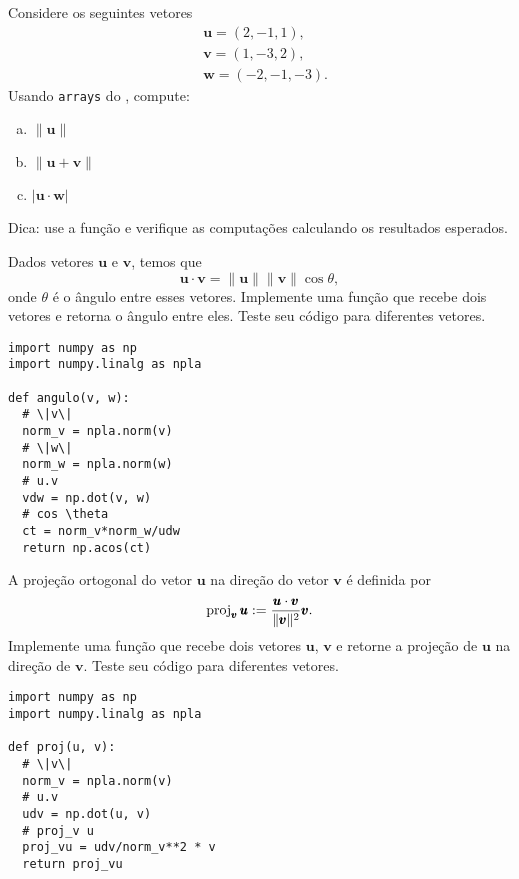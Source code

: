 \begin{exer}
  Considere os seguintes vetores
  \begin{align}
    & \pmb{u} = (2, -1, 1), \\
    & \pmb{v} = (1, -3, 2), \\
    & \pmb{w} = (-2, -1, -3).
  \end{align}
  Usando \texttt{arrays} do {\numpy}, compute:
  \begin{enumerate}[a)]
  \item $\|\pmb{u}\|$
  \item $\|\pmb{u} + \pmb{v}\|$
  \item $|\pmb{u}\cdot \pmb{w}|$
  \end{enumerate}
\end{exer}
\begin{resp}
  Dica: use a função {\PYTHONnumpyDOTlinalgDOTnorm} e verifique as computações calculando os resultados esperados.
\end{resp}

\begin{exer}
  Dados vetores $\pmb{u}$ e $\pmb{v}$, temos que
  \begin{equation}
    \pmb{u}\cdot\pmb{v} = \|\pmb{u}\|\|\pmb{v}\|\cos\theta,
  \end{equation}
  onde $\theta$ é o ângulo entre esses vetores. Implemente uma função que recebe dois vetores e retorna o ângulo entre eles. Teste seu código para diferentes vetores.
\end{exer}
\begin{resp}

\begin{lstlisting}
import numpy as np
import numpy.linalg as npla

def angulo(v, w):
  # \|v\|
  norm_v = npla.norm(v)
  # \|w\|
  norm_w = npla.norm(w)
  # u.v
  vdw = np.dot(v, w)
  # cos \theta
  ct = norm_v*norm_w/udw
  return np.acos(ct)
\end{lstlisting}

\end{resp}

\begin{exer}
  A projeção ortogonal do vetor $\pmb{u}$ na direção do vetor $\pmb{v}$ é definida por
  \begin{equation}
    \operatorname{proj}_{\pmb{v}} \pmb{u} := \frac{\pmb{u}\cdot\pmb{v}}{\|\pmb{v}\|^2}\pmb{v}.
  \end{equation}
  Implemente uma função que recebe dois vetores $\pmb{u}$, $\pmb{v}$ e retorne a projeção de $\pmb{u}$ na direção de $\pmb{v}$. Teste seu código para diferentes vetores.
\end{exer}
\begin{resp}

\begin{lstlisting}
import numpy as np
import numpy.linalg as npla

def proj(u, v):
  # \|v\|
  norm_v = npla.norm(v)
  # u.v
  udv = np.dot(u, v)
  # proj_v u
  proj_vu = udv/norm_v**2 * v
  return proj_vu
\end{lstlisting}

\end{resp}

